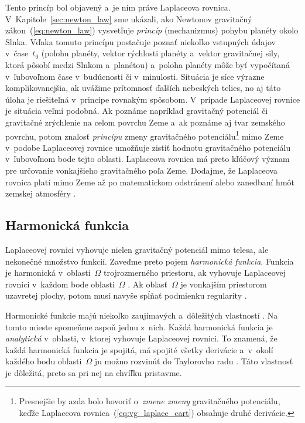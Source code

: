 \documentclass[a4paper, 12pt]{book}
\begin{document}
Tento princíp bol objavený a~je ním práve Laplaceova rovnica.  
V~Kapitole~\ref{sec:newton_law} sme ukázali, ako Newtonov gravitačný 
zákon~(\ref{eq:newton_law}) vysvetľuje \emph{princíp} (mechanizmus) pohybu 
planéty okolo Slnka.  Vďaka tomuto princípu postačuje poznať niekoľko vstupných 
údajov v~čase~$t_0$ (polohu planéty, vektor rýchlosti planéty a~vektor 
gravitačnej sily, ktorá pôsobí medzi Slnkom a~planétou) a~poloha planéty môže 
byť vypočítaná v~ľubovoľnom čase v~budúcnosti či v~minulosti.  Situácia je síce 
výrazne komplikovanejšia, ak uvážime prítomnosť ďalších nebeských telies, no aj 
táto úloha je riešiteľná v~princípe rovnakým spôsobom.  V~prípade Laplaceovej 
rovnice je situácia veľmi podobná.  Ak poznáme napríklad gravitačný potenciál 
či gravitačné zrýchlenie na celom povrchu Zeme a~ak poznáme aj tvar zemského 
povrchu, potom znalosť \emph{princípu} zmeny gravitačného 
potenciálu\footnote{Presnejšie by azda bolo hovoriť o~\textit{zmene zmeny} 
gravitačného potenciálu, keďže Laplaceova rovnica~(\ref{eq:vg_laplace_cart}) 
obsahuje druhé derivácie.} mimo Zeme v~podobe Laplaceovej rovnice umožňuje 
zistiť hodnotu gravitačného potenciálu v~ľubovoľnom bode tejto oblasti.  
Laplaceova rovnica má preto kľúčový význam pre určovanie vonkajšieho 
gravitačného poľa Zeme.  Dodajme, že Laplaceova rovnica platí mimo Zeme až po 
matematickom odstránení alebo zanedbaní hmôt zemskej atmosféry \parencite[pozri 
napríklad][]{Janak2006}.



\subsection{Harmonická funkcia}
\label{sec:harmonic_function}

Laplaceovej rovnici vyhovuje nielen gravitačný potenciál mimo telesa, ale
nekonečné množstvo funkcií.  Zaveďme preto pojem \emph{harmonická funkcia}.
Funkcia je harmonická v~oblasti~$\Omega$ trojrozmerného priestoru, ak vyhovuje 
Laplaceovej rovnici v~každom bode oblasti~$\Omega$ 
\parencite{MoritzPhysicalGeodesy}.  Ak oblasť~$\Omega$ je vonkajším priestorom 
uzavretej plochy, potom musí navyše spĺňať podmienku regularity 
\parencite[pozri vzťah~\ref{eq:regular_function};][]{MoritzPhysicalGeodesy}.

Harmonické funkcie majú niekoľko zaujímavých a~dôležitých vlastností 
\parencite[pozri napríklad][]{Kellogg1967,Pick1973,Janak2006}.  Na tomto mieste 
spomeňme aspoň jednu z~nich.  Každá harmonická funkcia je \emph{analytická} 
v~oblasti, v~ktorej vyhovuje Laplaceovej rovnici.  To znamená, že každá 
harmonická funkcia je spojitá, má spojité všetky derivácie a~v~okolí každého 
bodu oblasti~$\Omega$ ju možno rozvinúť do Taylorovho radu 
\parencite{MoritzPhysicalGeodesy}.  Táto vlastnosť je dôležitá, preto sa pri 
nej na chvíľku pristavme.
\end{document}
